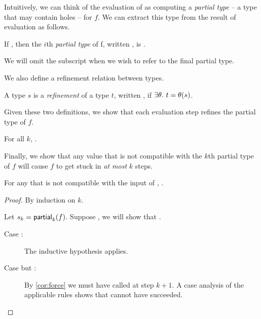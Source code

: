 Intuitively, we can think of the evaluation of  as
computing a \emph{partial type} -- a type that may contain holes -- for
$f$. We can extract this type from the result of evaluation as follows.

\begin{defn}
\label{defn:partial-type}
  If , then the $i$th
  \emph{partial type} of f, written ,
  is .

  We will omit the subscript when we wish to refer to the final partial
  type. 
\end{defn}

We also define a refinement relation between types.

\begin{defn}
\label{defn:subtyping}
  A type $s$ is a \emph{refinement} of a type $t$, written , if
  $\exists \theta.\ t = \theta(s)$.
\end{defn}

Given these two definitions, we show that each evaluation step
refines the partial type of $f$.

\begin{lem}
\label{lem:refine-partial}
  For all $k$, .
\end{lem}

Finally, we show that any value that is not compatible with the $k$th
partial type of $f$ will cause $f$ to get stuck in \emph{at most} $k$
steps.

\begin{lem}
\label{lem:k-stuck}
  For any  that is not compatible with
  the input of , .
\end{lem}
\begin{proof}
  By induction on $k$.
  
  Let $s_k = \mathsf{partial}_{k}(f)$. Suppose , we
  will show that .

  \begin{description}
  \item[Case :] 
    The inductive hypothesis applies.
  \item[Case  but :]
    By \autoref{cor:force} we must have called \forcesym at step $k+1$. A
    case analysis of the applicable rules shows that \forcesym cannot
    have succeeded.
  \end{description}
\end{proof}


